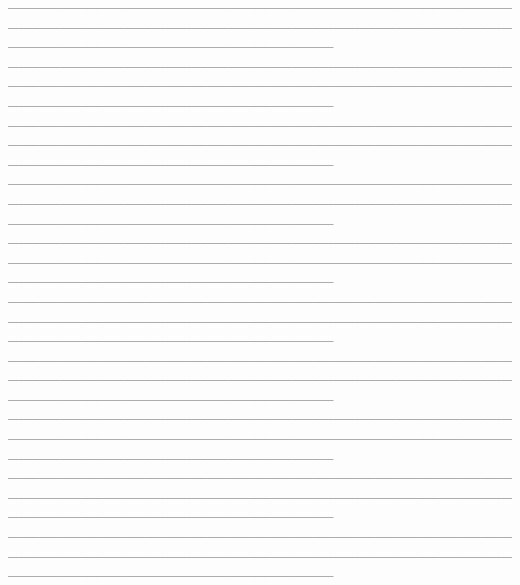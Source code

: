\documentclass[12pt]{article}
\begin{document}
\_\_\_\_\_\_\_\_\_\_\_\_\_\_\_\_\_\_\_\_\_\_\_\_\_\_\_\_\_\_\_\_\_\_\_\_\_\_\_\_\_\_\_\_\_\_\_\_\_\_\_\_\_\_\_\_\_\_\_\_\_\_\_\_\_\_\_\_\_\_\_\_\_\_\_\_\_\_\_\_\_\_\_\_\_\_\_\_\_\_\_\_\_\_\_\_\_\_\_\_\_\_\_\_\_\_\_\_\_\_\_\_\_\_\_\_\_\_\_\_\_\_\_\_\_\_\_ \\
\_\_\_\_\_\_\_\_\_\_\_\_\_\_\_\_\_\_\_\_\_\_\_\_\_\_\_\_\_\_\_\_\_\_\_\_\_\_\_\_\_\_\_\_\_\_\_\_\_\_\_\_\_\_\_\_\_\_\_\_\_\_\_\_\_\_\_\_\_\_\_\_\_\_\_\_\_\_\_\_\_\_\_\_\_\_\_\_\_\_\_\_\_\_\_\_\_\_\_\_\_\_\_\_\_\_\_\_\_\_\_\_\_\_\_\_\_\_\_\_\_\_\_\_\_\_\_ \\\_\_\_\_\_\_\_\_\_\_\_\_\_\_\_\_\_\_\_\_\_\_\_\_\_\_\_\_\_\_\_\_\_\_\_\_\_\_\_\_\_\_\_\_\_\_\_\_\_\_\_\_\_\_\_\_\_\_\_\_\_\_\_\_\_\_\_\_\_\_\_\_\_\_\_\_\_\_\_\_\_\_\_\_\_\_\_\_\_\_\_\_\_\_\_\_\_\_\_\_\_\_\_\_\_\_\_\_\_\_\_\_\_\_\_\_\_\_\_\_\_\_\_\_\_\_\_ \\\_\_\_\_\_\_\_\_\_\_\_\_\_\_\_\_\_\_\_\_\_\_\_\_\_\_\_\_\_\_\_\_\_\_\_\_\_\_\_\_\_\_\_\_\_\_\_\_\_\_\_\_\_\_\_\_\_\_\_\_\_\_\_\_\_\_\_\_\_\_\_\_\_\_\_\_\_\_\_\_\_\_\_\_\_\_\_\_\_\_\_\_\_\_\_\_\_\_\_\_\_\_\_\_\_\_\_\_\_\_\_\_\_\_\_\_\_\_\_\_\_\_\_\_\_\_\_ \\\_\_\_\_\_\_\_\_\_\_\_\_\_\_\_\_\_\_\_\_\_\_\_\_\_\_\_\_\_\_\_\_\_\_\_\_\_\_\_\_\_\_\_\_\_\_\_\_\_\_\_\_\_\_\_\_\_\_\_\_\_\_\_\_\_\_\_\_\_\_\_\_\_\_\_\_\_\_\_\_\_\_\_\_\_\_\_\_\_\_\_\_\_\_\_\_\_\_\_\_\_\_\_\_\_\_\_\_\_\_\_\_\_\_\_\_\_\_\_\_\_\_\_\_\_\_\_ \\\_\_\_\_\_\_\_\_\_\_\_\_\_\_\_\_\_\_\_\_\_\_\_\_\_\_\_\_\_\_\_\_\_\_\_\_\_\_\_\_\_\_\_\_\_\_\_\_\_\_\_\_\_\_\_\_\_\_\_\_\_\_\_\_\_\_\_\_\_\_\_\_\_\_\_\_\_\_\_\_\_\_\_\_\_\_\_\_\_\_\_\_\_\_\_\_\_\_\_\_\_\_\_\_\_\_\_\_\_\_\_\_\_\_\_\_\_\_\_\_\_\_\_\_\_\_\_ \\\_\_\_\_\_\_\_\_\_\_\_\_\_\_\_\_\_\_\_\_\_\_\_\_\_\_\_\_\_\_\_\_\_\_\_\_\_\_\_\_\_\_\_\_\_\_\_\_\_\_\_\_\_\_\_\_\_\_\_\_\_\_\_\_\_\_\_\_\_\_\_\_\_\_\_\_\_\_\_\_\_\_\_\_\_\_\_\_\_\_\_\_\_\_\_\_\_\_\_\_\_\_\_\_\_\_\_\_\_\_\_\_\_\_\_\_\_\_\_\_\_\_\_\_\_\_\_ \\\_\_\_\_\_\_\_\_\_\_\_\_\_\_\_\_\_\_\_\_\_\_\_\_\_\_\_\_\_\_\_\_\_\_\_\_\_\_\_\_\_\_\_\_\_\_\_\_\_\_\_\_\_\_\_\_\_\_\_\_\_\_\_\_\_\_\_\_\_\_\_\_\_\_\_\_\_\_\_\_\_\_\_\_\_\_\_\_\_\_\_\_\_\_\_\_\_\_\_\_\_\_\_\_\_\_\_\_\_\_\_\_\_\_\_\_\_\_\_\_\_\_\_\_\_\_\_ \\\_\_\_\_\_\_\_\_\_\_\_\_\_\_\_\_\_\_\_\_\_\_\_\_\_\_\_\_\_\_\_\_\_\_\_\_\_\_\_\_\_\_\_\_\_\_\_\_\_\_\_\_\_\_\_\_\_\_\_\_\_\_\_\_\_\_\_\_\_\_\_\_\_\_\_\_\_\_\_\_\_\_\_\_\_\_\_\_\_\_\_\_\_\_\_\_\_\_\_\_\_\_\_\_\_\_\_\_\_\_\_\_\_\_\_\_\_\_\_\_\_\_\_\_\_\_\_ \\\_\_\_\_\_\_\_\_\_\_\_\_\_\_\_\_\_\_\_\_\_\_\_\_\_\_\_\_\_\_\_\_\_\_\_\_\_\_\_\_\_\_\_\_\_\_\_\_\_\_\_\_\_\_\_\_\_\_\_\_\_\_\_\_\_\_\_\_\_\_\_\_\_\_\_\_\_\_\_\_\_\_\_\_\_\_\_\_\_\_\_\_\_\_\_\_\_\_\_\_\_\_\_\_\_\_\_\_\_\_\_\_\_\_\_\_\_\_\_\_\_\_\_\_\_\_\_
\end{document}
